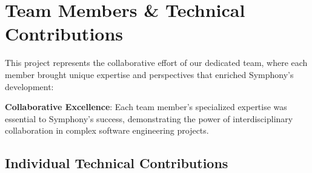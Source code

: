 \section*{Team Members \& Technical Contributions}

This project represents the collaborative effort of our dedicated team, where each member brought unique expertise and perspectives that enriched Symphony's development:

\begin{successbox}
\textbf{Collaborative Excellence}: Each team member's specialized expertise was essential to Symphony's success, demonstrating the power of interdisciplinary collaboration in complex software engineering projects.
\end{successbox}

\subsection*{Individual Technical Contributions}

